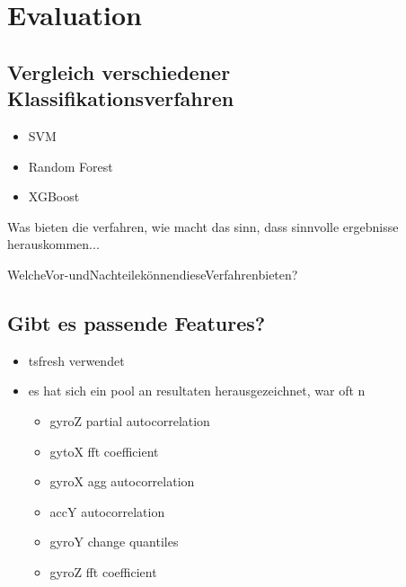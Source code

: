 
\chapter{Evaluation}
\label{ch:Evaluation}

\section{Vergleich verschiedener Klassifikationsverfahren}
\begin{itemize}
    \item SVM
    \item Random Forest
    \item XGBoost
\end{itemize}

Was bieten die verfahren, wie macht das sinn, dass sinnvolle ergebnisse herauskommen...

WelcheVor-undNachteilekönnendieseVerfahrenbieten?

\section{Gibt es passende Features?}
\begin{itemize}
    \item tsfresh verwendet
    \item es hat sich ein pool an resultaten herausgezeichnet, war oft n 
    \begin{itemize}
        \item gyroZ partial autocorrelation
        \item gytoX fft coefficient
        \item gyroX agg autocorrelation
        \item accY autocorrelation
        \item gyroY change quantiles 
        \item gyroZ fft coefficient
    \end{itemize}
\end{itemize}

